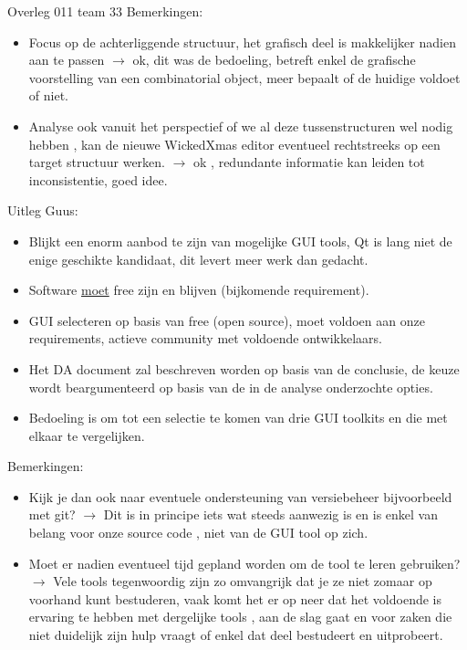 \documentclass{article}
\begin{document}
\begin{Minutes}{Overleg 011 team 33}
Bemerkingen:
\begin{itemize}
\item Focus op de achterliggende structuur, het grafisch deel is makkelijker nadien aan te passen  $\rightarrow$ ok, dit was de bedoeling, betreft enkel de grafische voorstelling van een combinatorial object, meer bepaalt of de huidige voldoet of niet.
\item Analyse ook vanuit het perspectief of we al deze tussenstructuren wel nodig hebben , kan de nieuwe WickedXmas editor eventueel rechtstreeks op een target structuur werken. $\rightarrow$ ok , redundante informatie kan leiden tot inconsistentie, goed idee.
\end{itemize}

\newpage
Uitleg Guus: 
\begin{itemize}
\item Blijkt een enorm aanbod te zijn van mogelijke GUI tools, Qt is lang niet de enige geschikte kandidaat, dit levert meer werk dan gedacht.
\item Software \underline{moet} free zijn en blijven (bijkomende requirement).
\item GUI selecteren op basis van free (open source), moet voldoen aan onze requirements, actieve community met voldoende ontwikkelaars.
\item Het DA document zal beschreven worden op basis van de conclusie, de keuze wordt beargumenteerd op basis van de in de analyse onderzochte opties.
\item Bedoeling is om tot een selectie te komen van drie GUI toolkits en die met elkaar te vergelijken.
\end{itemize}

Bemerkingen:
\begin{itemize}
\item Kijk je dan ook naar eventuele ondersteuning van versiebeheer bijvoorbeeld met git? $\rightarrow$ Dit is in principe iets wat steeds aanwezig is en is enkel van belang voor onze source code , niet van de GUI tool op zich.
\item Moet er nadien eventueel tijd gepland worden om de tool te leren gebruiken? $\rightarrow$ Vele tools tegenwoordig zijn zo omvangrijk dat je ze niet zomaar op voorhand kunt bestuderen, vaak komt het er op neer dat het voldoende is ervaring te hebben met dergelijke tools , aan de slag gaat en voor zaken die niet duidelijk zijn hulp vraagt of enkel dat deel bestudeert en uitprobeert. 
\end{itemize}



\end{Minutes}
\end{document}
